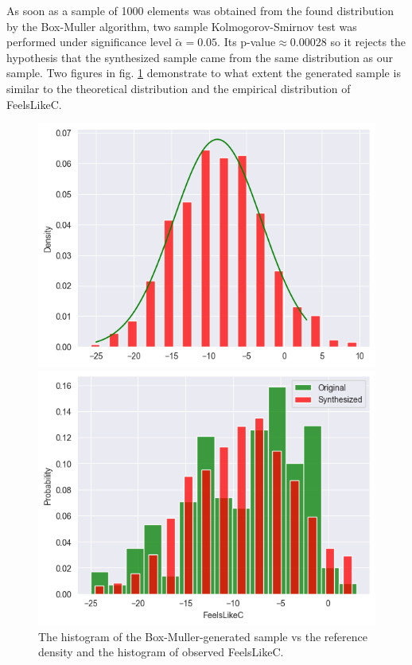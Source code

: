 \documentclass[12pt, bachelor, substylefile = algo_title.rtx]{disser}
\theoremstyle{definition}
\begin{document}
As soon as a sample of 1000 elements was obtained from the found distribution by the Box-Muller algorithm, two sample Kolmogorov-Smirnov test was performed under significance level $\widetilde{\alpha} = 0.05$. Its p-value$ \approx 0.00028$ so it rejects the hypothesis that the synthesized sample came from the same distribution as our sample. Two figures in fig. \ref{fig: 7} demonstrate to what extent the generated sample is similar to the theoretical distribution and the empirical distribution of FeelsLikeC.

\begin{figure}[!h]
   \begin{minipage}{.48\textwidth}
     \includegraphics[width=\linewidth]{feelslikec1}
   \end{minipage} \hfill
\begin{minipage}{.48\textwidth}
     \includegraphics[width=\linewidth]{feelslikec}
   \end{minipage}
\caption{The histogram of the Box-Muller-generated sample vs the reference density and the histogram of observed FeelsLikeC.}
\label{fig: 7}
\end{figure}
\end{document}
